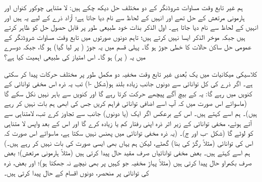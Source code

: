  ہم غیر تابع وقت مساوات شروڈنگر کے دو مختلف حل دیکھ چکے ہیں: لا متناہی چوکور کنواں اور ہارمونی مرتعش کے حل  تھے اور انہیں   کے لحاظ سے نام دیا جاتا ہے؛ آزاد ذرے کے لیے یہ  ہیں اور انہیں   کے لحاظ سے نام دیا جاتا ہے۔ اول الذکر بذات خود طبیعی طور پر قابل حصول حل کو ظاہر کرتے ہیں جبکہ موخر الذکر ایسا نہیں کرتے ہیں؛ تاہم دونوں صورتوں میں تابع وقت مساوات شروڈنگر کے عمومی حل ساکن حالات کا خطی جوڑ ہو گا۔ پہلی قسم میں یہ جوڑ ( پر لیا گیا)  ہو گا، جبکہ دوسرے میں یہ ( پر)  ہو گا۔ اس امتیاز کی طبیعی اہمیت کیا ہے؟

 کلاسیکی میکانیات میں یک بُعدی غیر تابع وقت مخفیہ دو مکمل طور پر مختلف حرکات پیدا کر سکتی ہے۔ اگر  ذرے کی کل توانائی  سے دونوں جانب زیادہ بلند ہو(شکل -ا) تب یہ ذرہ اس مخفی توانائی کے کنویں  میں  رہے گا: یہ  کے بیچ آگے پیچھے حرکت کرتا رہے گا اور کنویں  سے باہر نہیں نکل سکے گا (ماسوائے اس صورت میں کہ آپ اسے اضافی توانائی فراہم کریں جس کی ابھی ہم بات نہیں کر رہے ہیں)۔ ہم اسے  کہتے ہیں۔ اس کے برعکس اگر  ایک (یا دونوں) جانب  سے تجاوز کرے تب، لامتناہی سے آتے ہوئے، مخفی توانائی کے زیر اثر ذرہ اپنی رفتار کم یا زیادہ کرے گا اور اس کے بعد واپس لا متناہی کو لوٹے گا (شکل -ب اور ج)۔ (یہ ذرہ مخفی توانائی میں پھنس نہیں سکتا ہے، ماسوائے اس صورت کہ اس کی توانائی (مثلاً رگڑ کی بنا) گھٹے، لیکن ہم یہاں بھی ایسی صورت کی بات نہیں کر رہے ہیں۔) ہم اسے  کہتے ہیں۔ بعض مخفی توانائیاں صرف مقید حال پیدا کرتی ہیں (مثلاً ہارمونی مرتعش)؛ بعض صرف بکھراو حال پیدا کرتی ہیں (مثلاً پہاڑ مخفیہ جو کہیں پر بھی نیچے نہ جھکتا ہو)؛ اور بعض، ذرہ کی توانائی پر منحصر، دونوں اقسام کے حال پیدا کرتی ہیں۔
